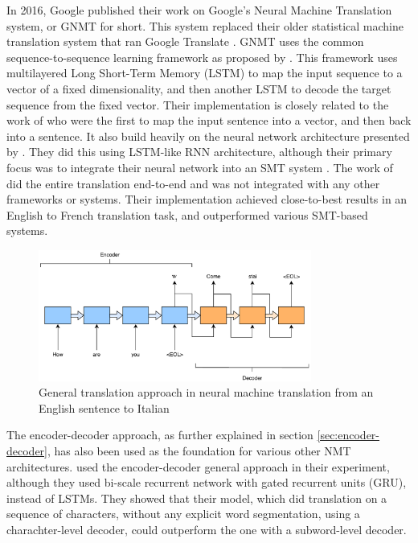 In 2016, Google published their work on Google's Neural Machine Translation system, or GNMT for short. This system replaced their older statistical machine translation system that ran Google Translate \citep{turovsky2016googletranslatenmt}. GNMT uses the common sequence-to-sequence learning framework as proposed by \citep{sutskever2014sequence, wu2016google}. This framework uses multilayered Long Short-Term Memory (LSTM) to map the input sequence to a vector of a fixed dimensionality, and then another LSTM to decode the target sequence from the fixed vector. Their implementation is closely related to the work of \citep{kalchbrenner2013recurrent} who were the first to map the input sentence into a vector, and then back into a sentence. It also build heavily on the neural network architecture presented by \citep{cho2014learning}. They did this using LSTM-like RNN architecture, although their primary focus was to integrate their neural network into an SMT system \citep{cho2014learning, sutskever2014sequence}. The work of \citep{sutskever2014sequence} did the entire translation end-to-end and was not integrated with any other frameworks or systems. Their implementation achieved close-to-best results in an English to French translation task, and outperformed various SMT-based systems.

\begin{figure}[ht]
    \centering
    \includegraphics[width=0.8\textwidth]{fig/related_work/encoder_decoder_en_it.pdf}
    \caption{General translation approach in neural machine translation from an English sentence to Italian}
    \label{fig:machine-translation-encoder-decoder-simple}
\end{figure}

The encoder-decoder approach, as further explained in section \ref{sec:encoder-decoder}, has also been used as the foundation for various other NMT architectures. \citep{chung2016character} used the encoder-decoder general approach in their experiment, although they used bi-scale recurrent network with gated recurrent units (GRU), instead of LSTMs. They showed that their model, which did translation on a sequence of characters, without any explicit word segmentation, using a charachter-level decoder, could outperform the one with a subword-level decoder.

